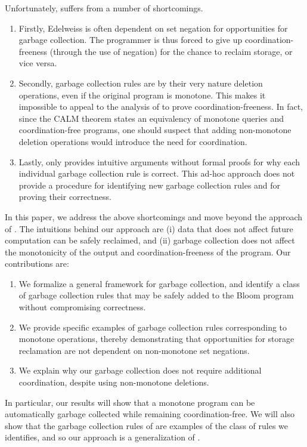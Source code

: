 Unfortunately, \cite{conway2014edelweiss} suffers from a number of shortcomings.
\begin{enumerate}
\item Firstly, Edelweiss is often dependent on set negation for opportunities for garbage collection.
The programmer is thus forced to give up coordination-freeness (through the use of negation) for the chance to reclaim storage, or vice versa.
\item Secondly, garbage collection rules are by their very nature deletion operations, even if the original program is monotone.
This makes it impossible to appeal to the analysis of \cite{marczak2012confluence} to prove coordination-freeness.
In fact, since the CALM theorem states an equivalency of monotone queries and coordination-free programs, one should suspect that adding non-monotone deletion operations would introduce the need for coordination.
\item Lastly, \cite{conway2014edelweiss} only provides intuitive arguments without formal proofs for why each individual garbage collection rule is correct.
This ad-hoc approach does not provide a procedure for identifying new garbage collection rules and for proving their correctness.
\end{enumerate}

In this paper, we address the above shortcomings and move beyond the approach of \cite{conway2014edelweiss}.
The intuitions behind our approach are (i) data that does not affect future computation can be safely reclaimed, and (ii) garbage collection does not affect the monotonicity of the output and coordination-freeness of the program.
Our contributions are:
\begin{enumerate}
\item We formalize a general framework for garbage collection, and identify a class of garbage collection rules that may be safely added to the Bloom program without compromising correctness.
\item We provide specific examples of garbage collection rules corresponding to monotone operations, thereby demonstrating that opportunities for storage reclamation are not dependent on non-monotone set negations.
\item We explain why our garbage collection does not require additional coordination, despite using non-monotone deletions.
\end{enumerate}

In particular, our results will show that a monotone program can be automatically garbage collected while remaining coordination-free.
We will also show that the garbage collection rules of \cite{conway2014edelweiss} are examples of the class of rules we identifies, and so our approach is a generalization of \cite{conway2014edelweiss}.





